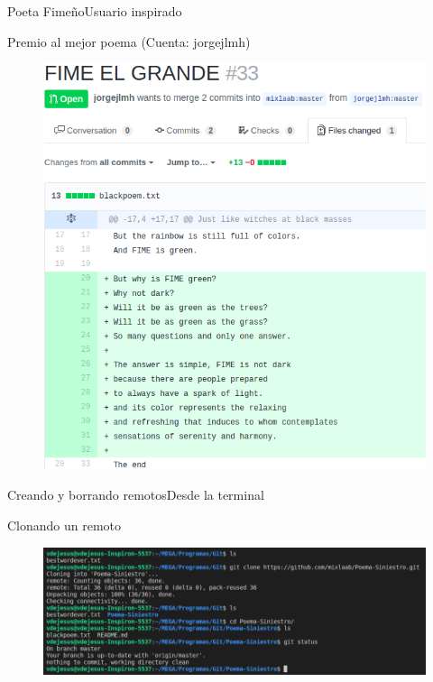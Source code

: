 \documentclass[10pt]{beamer}
\begin{document}
\begin{frame}{Poeta Fimeño}{Usuario inspirado}

\begin{block}{Premio al mejor poema (Cuenta: jorgejlmh)}

\begin{figure}[h!]
\centering
\includegraphics [scale=0.28]{step3}
\label{fig:step3}
\end{figure}
    
\end{block}

\end{frame}

\begin{frame}{Creando y borrando remotos}{Desde la terminal}

  \begin{block}{Clonando un remoto}
  
  \begin{figure}[h!]
  \centering
  \includegraphics [scale=0.3]{step4}
  \label{fig:step4}
  \end{figure}
      
  \end{block}
  
\end{frame}
\end{document}

